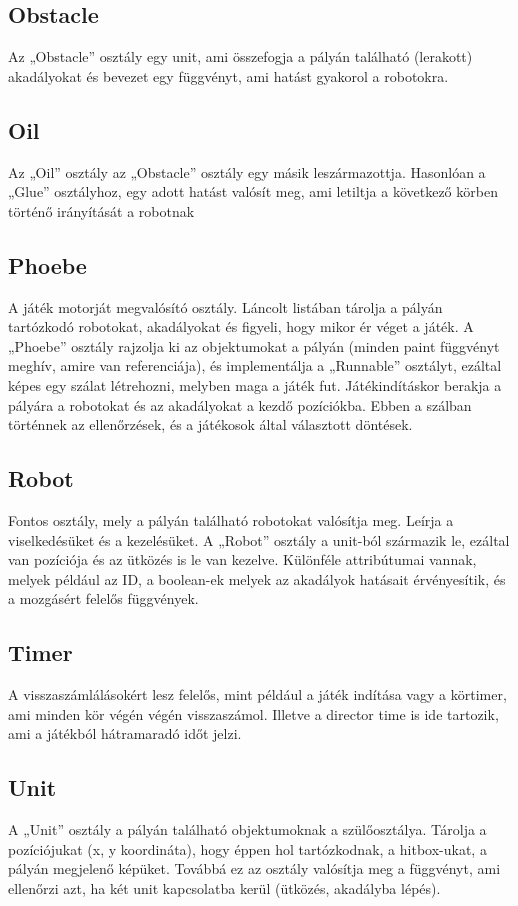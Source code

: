 \subsection{Obstacle}
Az „Obstacle” osztály egy unit, ami összefogja a pályán található (lerakott) akadályokat és bevezet egy függvényt, ami hatást gyakorol a robotokra.
\subsection{Oil}
Az „Oil” osztály az „Obstacle” osztály egy másik leszármazottja. Hasonlóan a „Glue” osztályhoz, egy adott hatást valósít meg, ami letiltja a következő körben történő irányítását a robotnak
\subsection{Phoebe}
A játék motorját megvalósító osztály. Láncolt listában tárolja a pályán tartózkodó robotokat, akadályokat és figyeli, hogy mikor ér véget a játék. A „Phoebe” osztály rajzolja ki az objektumokat a pályán (minden paint függvényt meghív, amire van referenciája), és implementálja a „Runnable” osztályt, ezáltal képes egy szálat létrehozni, melyben maga a játék fut. Játékindításkor berakja a pályára a robotokat és az akadályokat a kezdő pozíciókba. Ebben a szálban történnek az ellenőrzések, és a játékosok által választott döntések.

\subsection{Robot}
Fontos osztály, mely a pályán található robotokat valósítja meg. Leírja a viselkedésüket és a kezelésüket. A „Robot” osztály a unit-ból származik le, ezáltal van pozíciója és az ütközés is le van kezelve. Különféle attribútumai vannak, melyek például az ID, a boolean-ek melyek az akadályok hatásait érvényesítik, és a mozgásért felelős függvények.

\subsection{Timer}
A visszaszámlálásokért lesz felelős, mint például a játék indítása vagy a körtimer, ami minden kör végén végén visszaszámol. Illetve a director time is ide tartozik, ami a játékból hátramaradó időt jelzi.
\subsection{Unit}
A „Unit” osztály a pályán található objektumoknak a szülőosztálya. Tárolja a pozíciójukat (x, y koordináta), hogy éppen hol tartózkodnak, a hitbox-ukat, a pályán megjelenő képüket. Továbbá ez az osztály valósítja meg a függvényt, ami ellenőrzi azt, ha két unit kapcsolatba kerül (ütközés, akadályba lépés).


